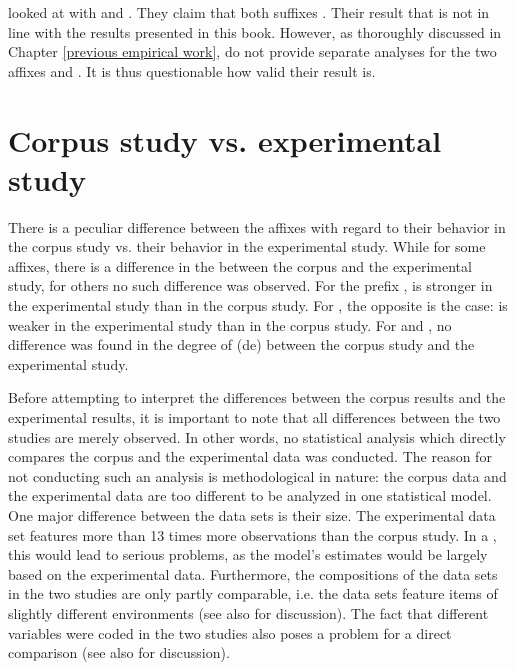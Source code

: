 \cite{Kotzor.2016} looked at  with  and . They claim that both suffixes . Their result that   is not in line with the results presented in this book. However, as thoroughly discussed in Chapter \ref{previous empirical work}, \cite{Kotzor.2016} do not provide separate analyses for the two affixes  and . It is thus questionable how valid their result is. 


\section{Corpus study vs. experimental study}


There is a peculiar difference between the affixes with regard to their behavior in the corpus study vs. their behavior in the experimental study.
While for some affixes, there is a difference in the  between the corpus and the experimental study, for others no such difference was observed. For the prefix ,  is stronger in the experimental study than in the corpus study. For , the opposite is the case:  is weaker in the experimental study than in the corpus study. For  and , no difference was found in the degree of (de) between the corpus study and the experimental study.

Before attempting to interpret the differences between the corpus results and the experimental results, it is important to note that all differences between the two studies are merely observed. In other words, no statistical analysis which directly compares the corpus and the experimental data was conducted. The reason for not conducting such an analysis is methodological in nature: the corpus data and the experimental data are too different to be analyzed in one statistical model. 
One major difference between the data sets is their size. The experimental data set features more than 13 times more observations than the corpus study. In a , this would lead to serious problems, as the model's estimates would be largely based on the experimental data.
 Furthermore, the compositions of the data sets in the two studies are only partly comparable, i.e. the data sets feature items of slightly different environments (see also  for discussion). The fact that different variables were coded in the two studies also poses a problem for a direct comparison (see also  for discussion).

